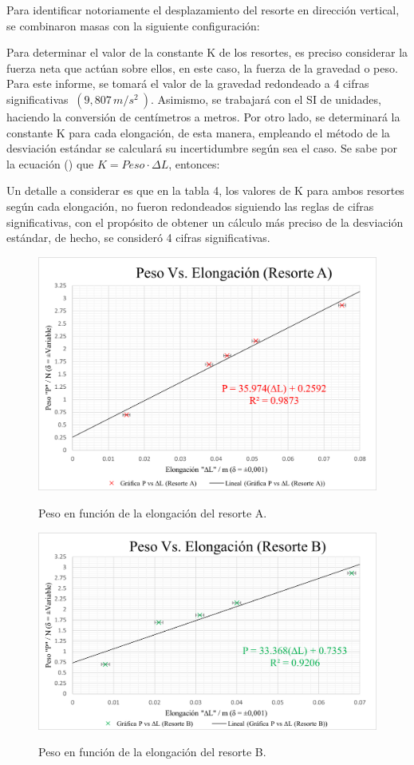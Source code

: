 \documentclass[../main.tex]{subfiles}
\begin{document}

Para identificar notoriamente el desplazamiento del resorte en dirección vertical, se combinaron masas con la siguiente configuración:


Para determinar el valor de la constante K de los resortes, es preciso considerar la
fuerza neta que actúan sobre ellos, en este caso, la fuerza de la gravedad o peso.
Para este informe, se tomará el valor de la gravedad redondeado a 4 cifras 
significativas $\ (9,807 \, m/s^2\ )$. Asimismo, se trabajará con el SI
de unidades, haciendo la conversión de centímetros a metros. Por otro lado, se determinará 
la constante K para cada elongación, de esta manera, empleando el método de la 
desviación estándar se calculará su incertidumbre según sea el caso.
Se sabe por la ecuación () que $ K = Peso \cdot \Delta L$, entonces:


Un detalle a considerar es que en la tabla 4, los valores de K para ambos resortes 
según cada elongación, no fueron redondeados siguiendo las reglas de cifras significativas, con el propósito de obtener un cálculo más preciso de la desviación estándar, de hecho, se consideró 4 cifras significativas.

\begin{figure}[H]
    \centering
    \includegraphics[width=0.8\linewidth]{images/calc1.png}
    \label{ref:calc1}
    \caption{Peso en función de la elongación del resorte A.}
\end{figure}
\begin{figure}[H]
    \centering
    \includegraphics[width=0.8\linewidth]{images/calc2.png}
    \label{ref:calc2}
    \caption{Peso en función de la elongación del resorte B.}
\end{figure}
\end{document}
